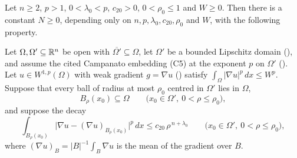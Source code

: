 \begin{lemma}
Let $n\ge2$, $p>1$, $0<\lambda_0<p$, $c_{20}>0$, $0<\rho_0\le1$ and $W\ge0$.
Then there is a constant $N\ge0$, depending only on
$n,p,\lambda_0,c_{20},\rho_0$ and $W$, with the following property.

Let $\Omega,\Omega'\subseteq\mathbb{R}^n$ be open with
$\overline{\Omega'}\subseteq\Omega$, let $\Omega'$ be a bounded Lipschitz domain
(), and assume the cited Campanato embedding
(C5) at the exponent $p$ on $\Omega'$ ().  Let
$u\in W^{1,p}(\Omega)$ with weak gradient $g=\nabla u$ ()
satisfy $\int_\Omega|\nabla u|^p\,dx\le W^p$.  Suppose that every ball of
radius at most $\rho_0$ centred in $\Omega'$ lies in $\Omega$,
\[
B_\rho(x_0)\subseteq\Omega
\qquad\bigl(x_0\in\Omega',\ 0<\rho\le\rho_0\bigr),
\tag{C}
\]
and suppose the decay
\[
\int_{B_\rho(x_0)}\bigl|\nabla u-(\nabla u)_{B_\rho(x_0)}\bigr|^p\,dx
\le c_{20}\,\rho^{\,n+\lambda_0}
\qquad\bigl(x_0\in\Omega',\ 0<\rho\le\rho_0\bigr),
\tag{D}
\]
where $(\nabla u)_{B}=|B|^{-1}\int_B\nabla u$ is the mean of the gradient over
$B$.


\end{lemma}
